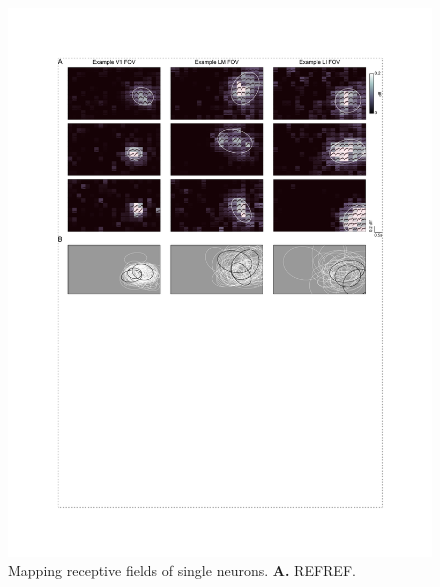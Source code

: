 \begin{figure}[t!]
    \includegraphics[width=\textwidth]{figures/chapter_3/fig_3-2_rf_examples/fig_3-2_rf_examples.pdf}
    \vspace{.1in}
    \caption[Receptive field mapping]{Mapping receptive fields of single neurons. \textbf{A.} REFREF.
    \label{fig:rf_examples}}
\end{figure}

